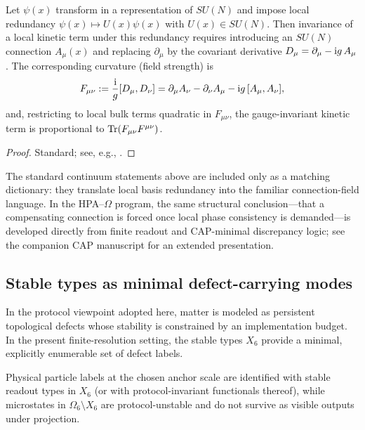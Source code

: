\begin{proposition}\label{prop:local_sun_connection}
Let $\psi(x)$ transform in a representation of $SU(N)$ and impose local redundancy $\psi(x)\mapsto U(x)\psi(x)$ with $U(x)\in SU(N)$.
Then invariance of a local kinetic term under this redundancy requires introducing an $SU(N)$ connection $A_\mu(x)$ and replacing $\partial_\mu$ by the covariant derivative $D_\mu=\partial_\mu-\mathrm{i} g\,A_\mu$.
The corresponding curvature (field strength) is
\[
F_{\mu\nu}:=\frac{\mathrm{i}}{g}[D_\mu,D_\nu]=\partial_\mu A_\nu-\partial_\nu A_\mu-\mathrm{i} g\,[A_\mu,A_\nu],
\]
and, restricting to local bulk terms quadratic in $F_{\mu\nu}$, the gauge-invariant kinetic term is proportional to $\mathrm{Tr}(F_{\mu\nu}F^{\mu\nu})$.
\end{proposition}
\begin{proof}
Standard; see, e.g., \cite{YangMills1954,PeskinSchroeder1995,WeinbergQFT1995}.
\end{proof}

\begin{remark}\label{rem:cap_gauge_fields_pointer}
The standard continuum statements above are included only as a matching dictionary: they translate local basis redundancy into the familiar connection-field language.
In the HPA--$\Omega$ program, the same structural conclusion---that a compensating connection is forced once local phase consistency is demanded---is developed directly from finite readout and CAP-minimal discrepancy logic; see the companion CAP manuscript \cite{Ma2025CAP} for an extended presentation.
\end{remark}

\subsection{Stable types as minimal defect-carrying modes}
\label{subsec:matter_as_types}

In the protocol viewpoint adopted here, matter is modeled as persistent topological defects whose stability is constrained by an implementation budget.
In the present finite-resolution setting, the stable types $X_6$ provide a minimal, explicitly enumerable set of defect labels.

\begin{definition}
\label{def:particles_as_types}
Physical particle labels at the chosen anchor scale are identified with stable readout types in $X_6$ (or with protocol-invariant functionals thereof), while microstates in $\Omega_6\setminus X_6$ are protocol-unstable and do not survive as visible outputs under projection.
\end{definition}

